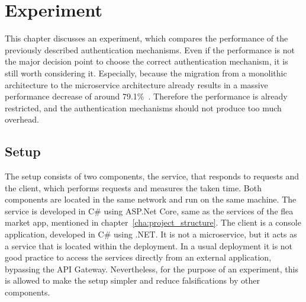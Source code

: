 \chapter{Experiment}
\label{cha:experiment}
This chapter discusses an experiment, which compares the performance of the previously described authentication mechanisms.
Even if the performance is not the major decision point to choose the correct authentication mechanism, it is still worth considering it.
Especially, because the migration from a monolithic architecture to the microservice architecture already results in a massive performance decrease of around 79.1\%~\cite{ueda2016workload}.
Therefore the performance is already restricted, and the authentication mechanisms should not produce too much overhead.

\section{Setup}
The setup consists of two components, the service, that responds to requests and the client, which performs requests and measures the taken time.
Both components are located in the same network and run on the same machine.
The service is developed in C\# using ASP.Net Core, same as the services of the flea market app, mentioned in chapter~\ref{cha:project_structure}.
The client is a console application, developed in C\# using .NET.
It is not a microservice, but it acts as a service that is located within the deployment.
In a usual deployment it is not good practice to access the services directly from an external application, bypassing the API Gateway.
Nevertheless, for the purpose of an experiment, this is allowed to make the setup simpler and reduce falsifications by other components. 


